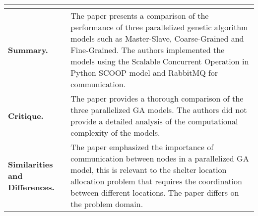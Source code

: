 \begin{longtable}{|L{.2\linewidth}|L{.74\linewidth}|}
	\hline
	\\ \hline
	\textbf{Summary.} & The paper presents a comparison of the performance of three parallelized genetic algorithm models such as Master-Slave, Coarse-Grained and Fine-Grained. The authors implemented the models using the Scalable Concurrent Operation in Python SCOOP model and RabbitMQ for communication.\\ \hline
	\textbf{Critique.} & The paper provides a thorough comparison of the three parallelized GA models. The authors did not provide a detailed analysis of the computational complexity of the models.\\ \hline
	\textbf{Similarities and Differences.} & The paper emphasized the importance of communication between nodes in a parallelized GA model, this is relevant to the shelter location allocation problem that requires the coordination between different locations.	The paper differs on the problem domain.\\ \hline
\end{longtable}

